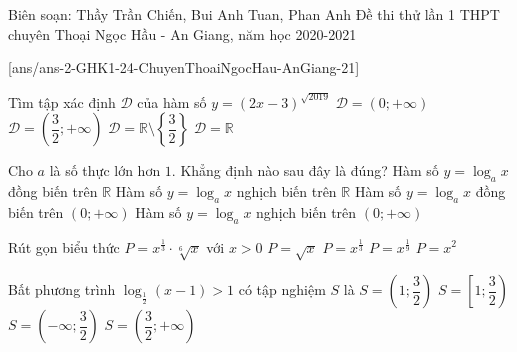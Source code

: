 \begin{name}
	{Biên soạn: Thầy Trần Chiến, Bui Anh Tuan, Phan Anh}
	{Đề thi thử lần 1 THPT chuyên Thoại Ngọc Hầu - An Giang, năm học 2020-2021}
\end{name}
	\setcounter{ex}{0}\setcounter{bt}{0}
	[ans/ans-2-GHK1-24-ChuyenThoaiNgocHau-AnGiang-21]

\begin{ex}%
	Tìm tập xác định $\mathscr{D}$ của hàm số $y=(2x-3)^{\sqrt{2019}}$
	\choice
	{$\mathscr{D}=(0;+\infty)$}
	{\True $\mathscr{D}=\left(\dfrac{3}{2};+\infty\right)$}
	{$\mathscr{D}=\mathbb{R}\setminus\left\{\dfrac{3}{2}\right\}$}
	{$\mathscr{D}=\mathbb{R}$}
\end{ex}
\begin{ex}%
	Cho $a$ là số thực lớn hơn $1$. Khẳng định nào sau đây là đúng?
	\choice
	{Hàm số $y=\log_a x$ đồng biến trên $\mathbb{R}$}
	{Hàm số $y=\log_a x$ nghịch biến trên $\mathbb{R}$}
	{\True Hàm số $y=\log_a x$ đồng biến trên $(0;+\infty)$}
	{Hàm số $y=\log_a x$ nghịch biến trên $(0;+\infty)$}
\end{ex}
\begin{ex}%
	Rút gọn biểu thức $P=x^{\frac{1}{3}}\cdot \sqrt[6]{x}$ với $x>0$
	\choice
	{\True $P=\sqrt{x}$}
	{$P=x^{\frac{1}{3}}$}
	{$P=x^{\frac{1}{9}}$}
	{$P=x^2$}
\end{ex}
\begin{ex}%
	Bất phương trình $\log_{\tfrac{1}{2}}(x-1)>1$ có tập nghiệm $S$ là
	\choice
	{\True $S=\left(1;\dfrac{3}{2}\right)$}
	{$S=\left[1;\dfrac{3}{2}\right)$}
	{$S=\left(-\infty;\dfrac{3}{2}\right)$}
	{$S=\left(\dfrac{3}{2};+\infty\right)$}
\end{ex}
